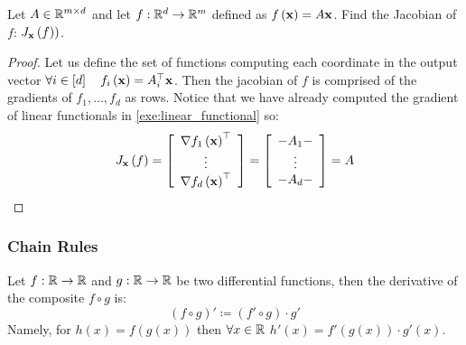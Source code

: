 \begin{exercise}\label{exe:lin_jcob}
Let $A\in\mathbb{R}^{m\times d}$ and let $f:\mathbb{R}^d\rightarrow\mathbb{R}^m$ defined as $f\left(\mathbf{x}\right)=A\mathbf{x}$.  Find the Jacobian of $f$: $J_{\mathbf{x}}\left(f)\right)$.
\end{exercise}
\begin{proof}
Let us define the set of functions computing each coordinate in the output vector $\forall i\in\left[d\right]\quad f_i\left(\mathbf{x}\right)=A_i^\top \mathbf{x}$. Then the jacobian of $f$ is comprised of the gradients of $f_1,\ldots, f_d$ as rows. Notice that we have already computed the gradient of linear functionals in \autoref{exe:linear_functional} so:
$$ J_{\mathbf{x}}\left(f\right)=\left[\begin{array}{c}
	\nabla f_{1}\left(\mathbf{x}\right)^{\top}\\
	\vdots\\
	\nabla f_{d}\left(\mathbf{x}\right)^{\top}
\end{array}\right]=\left[\begin{array}{c}
	-A_{1}-\\
	\vdots\\
	-A_{d}-
\end{array}\right]=A $$
\end{proof}

\subsubsection{Chain Rules}
\begin{theorem}
Let $f:\mathbb{R}\to\mathbb{R}$ and $g:\mathbb{R}\to\mathbb{R}$ be two differential functions, then the derivative of the composite $f\circ g$ is: $$ \left(f\circ g\right)' \coloneqq \left(f'\circ g\right)\cdot g' $$
Namely, for $h\left(x\right)=f\left(g\left(x\right)\right)$ then $\forall x\in\mathbb{R}$ $h'\left(x\right)=f'\left(g\left(x\right)\right)\cdot g'\left(x\right)$.
\end{theorem}

